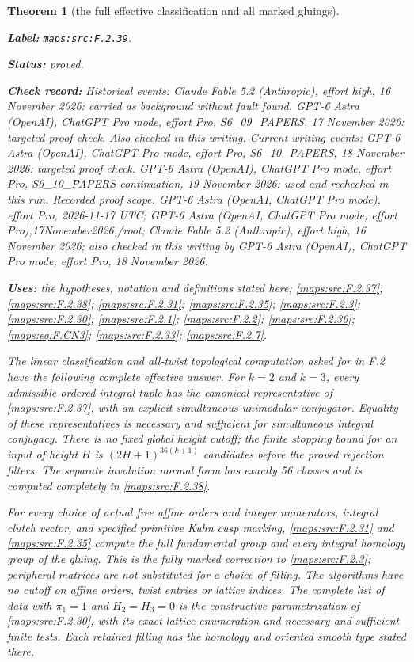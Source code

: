 \documentclass[11pt,a4paper]{article}
\newtheorem{theorem}{Theorem}[section]
\theoremstyle{definition}
\newcommand{\StatementRecord}[4]{\par\smallskip\begingroup\upshape\raggedright\noindent\textbf{Label:} \nolinkurl{#1}.\par\noindent\textbf{Status:} #2.\par\noindent\textbf{Check record:} #3.\par\noindent\textbf{Uses:} #4.\par\endgroup\smallskip}
\begin{document}
\begin{theorem}[the full effective classification and all marked gluings]\label{maps:src:F.2.39}
\StatementRecord{maps:src:F.2.39}{proved}{Historical events: Claude Fable 5.2 (Anthropic), effort high, 16 November 2026: carried as background without fault found. GPT-6 Astra (OpenAI), ChatGPT Pro mode, effort Pro, S6\_09\_PAPERS, 17 November 2026: targeted proof check. Also checked in this writing. Current writing events: GPT-6 Astra (OpenAI), ChatGPT Pro mode, effort Pro, S6\_10\_PAPERS, 18 November 2026: targeted proof check. GPT-6 Astra (OpenAI), ChatGPT Pro mode, effort Pro, S6\_10\_PAPERS continuation, 19 November 2026: used and rechecked in this run. \emph{Recorded proof scope.} GPT-6 Astra (OpenAI, ChatGPT Pro mode), effort Pro, 2026-11-17 UTC; GPT-6 Astra (OpenAI, ChatGPT Pro mode, effort Pro),17November2026,/root; Claude Fable 5.2 (Anthropic), effort high, 16 November 2026; also checked in this writing by GPT-6 Astra (OpenAI), ChatGPT Pro mode, effort Pro, 18 November 2026}{the hypotheses, notation and definitions stated here; \cref{maps:src:F.2.37}; \cref{maps:src:F.2.38}; \cref{maps:src:F.2.31}; \cref{maps:src:F.2.35}; \cref{maps:src:F.2.3}; \cref{maps:src:F.2.30}; \cref{maps:src:F.2.1}; \cref{maps:src:F.2.2}; \cref{maps:src:F.2.36}; \cref{maps:eq:F.CN3}; \cref{maps:src:F.2.33}; \cref{maps:src:F.2.7}}


The linear classification and all-twist topological computation
asked for in F.2 have the following complete effective answer.
For $k=2$ and $k=3$, every admissible ordered integral tuple
has the canonical representative of \ref{maps:src:F.2.37}, with an explicit
simultaneous unimodular conjugator.  Equality of these
representatives is necessary and sufficient for simultaneous
integral conjugacy.  There is no fixed global height cutoff;
the finite stopping bound for an input of height $H$ is
$(2H+1)^{36(k+1)}$ candidates before the proved rejection
filters.  The separate involution normal form has exactly
56 classes and is computed completely in \ref{maps:src:F.2.38}.

For every choice of actual free affine orders and integer
numerators, integral clutch vector, and specified primitive
Kuhn cusp marking, \ref{maps:src:F.2.31} and \ref{maps:src:F.2.35} compute the full
fundamental group and every integral homology group of the
gluing.  This is the fully marked correction to \ref{maps:src:F.2.3};
peripheral matrices are not substituted for a choice of
filling.  The algorithms have no cutoff on affine orders,
twist entries or lattice indices.  The complete list of data
with $\pi_1=1$ and $H_2=H_3=0$ is the constructive
parametrization of \ref{maps:src:F.2.30}, with its exact lattice enumeration
and necessary-and-sufficient finite tests.  Each retained
filling has the homology and oriented smooth type stated
there.

\end{theorem}
\end{document}
